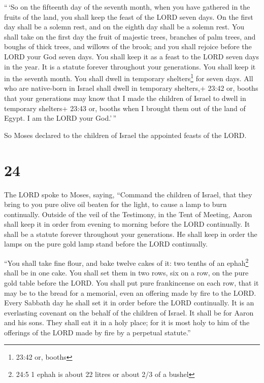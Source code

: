  ``\,`So on the fifteenth day of the seventh month, when
you have gathered in the fruits of the land, you shall keep the feast of
the LORD seven days. On the first day shall be a solemn rest, and on the
eighth day shall be a solemn rest.  You shall take on the
first day the fruit of majestic trees, branches of palm trees, and
boughs of thick trees, and willows of the brook; and you shall rejoice
before the LORD your God seven days.  You shall keep it as
a feast to the LORD seven days in the year. It is a statute forever
throughout your generations. You shall keep it in the seventh month.
 You shall dwell in temporary shelters\footnote{23:42 or,
  booths} for seven days. All who are native-born in Israel shall dwell
in temporary shelters,+ 23:42 or, booths  that your
generations may know that I made the children of Israel to dwell in
temporary shelters+ 23:43 or, booths when I brought them out of the land
of Egypt. I am the LORD your God.'\,''

 So Moses declared to the children of Israel the appointed
feasts of the LORD.

\hypertarget{section-23}{%
\section{24}\label{section-23}}

 The LORD spoke to Moses, saying,  ``Command the
children of Israel, that they bring to you pure olive oil beaten for the
light, to cause a lamp to burn continually.  Outside of the
veil of the Testimony, in the Tent of Meeting, Aaron shall keep it in
order from evening to morning before the LORD continually. It shall be a
statute forever throughout your generations.  He shall keep
in order the lamps on the pure gold lamp stand before the LORD
continually.

 ``You shall take fine flour, and bake twelve cakes of it:
two tenths of an ephah\footnote{24:5 1 ephah is about 22 litres or about
  2/3 of a bushel} shall be in one cake.  You shall set them
in two rows, six on a row, on the pure gold table before the LORD.
 You shall put pure frankincense on each row, that it may be
to the bread for a memorial, even an offering made by fire to the LORD.
 Every Sabbath day he shall set it in order before the LORD
continually. It is an everlasting covenant on the behalf of the children
of Israel.  It shall be for Aaron and his sons. They shall
eat it in a holy place; for it is most holy to him of the offerings of
the LORD made by fire by a perpetual statute.''

